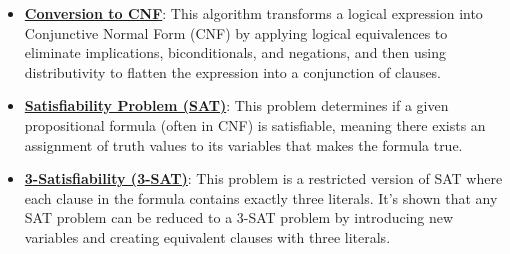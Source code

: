 \documentclass{article}%
\begin{document}
\begin{itemize}[leftmargin=*]%
\item \href{https://purdue.brightspace.com/d2l/common/assets/pdfjs-d2l-dist/1.0.14-legacy/web/viewer.html?file=%2Fcontent%2Fenforced%2F1095467-wl.202510.CS.24300.001%2F13L1-Logic.pdf%3Fou%3D1095467&lang=en-us&container=d2l-fileviewer-rendered-pdf&fullscreen=d2l-fileviewer-rendered-pdf-dialog&height=667#page=17}{\textbf{Conversion to CNF}}: This algorithm transforms a logical expression into Conjunctive Normal Form (CNF) by applying logical equivalences to eliminate implications, biconditionals, and negations, and then using distributivity to flatten the expression into a conjunction of clauses.%
\item \href{https://purdue.brightspace.com/d2l/common/assets/pdfjs-d2l-dist/1.0.14-legacy/web/viewer.html?file=%2Fcontent%2Fenforced%2F1095467-wl.202510.CS.24300.001%2F13L1-Logic.pdf%3Fou%3D1095467&lang=en-us&container=d2l-fileviewer-rendered-pdf&fullscreen=d2l-fileviewer-rendered-pdf-dialog&height=667#page=15}{\textbf{Satisfiability Problem (SAT)}}: This problem determines if a given propositional formula (often in CNF) is satisfiable, meaning there exists an assignment of truth values to its variables that makes the formula true.%
\item \href{https://purdue.brightspace.com/d2l/common/assets/pdfjs-d2l-dist/1.0.14-legacy/web/viewer.html?file=%2Fcontent%2Fenforced%2F1095467-wl.202510.CS.24300.001%2F13L1-Logic.pdf%3Fou%3D1095467&lang=en-us&container=d2l-fileviewer-rendered-pdf&fullscreen=d2l-fileviewer-rendered-pdf-dialog&height=667#page=24}{\textbf{3{-}Satisfiability (3{-}SAT)}}: This problem is a restricted version of SAT where each clause in the formula contains exactly three literals. It's shown that any SAT problem can be reduced to a 3-SAT problem by introducing new variables and creating equivalent clauses with three literals.%
\end{itemize}%
\end{document}
